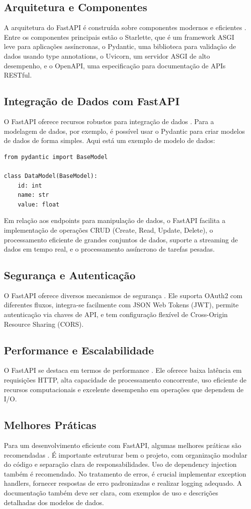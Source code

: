 \subsection{Arquitetura e Componentes}
A arquitetura do FastAPI é construída sobre componentes modernos e eficientes \cite{kumar2023modern}. Entre os componentes principais estão o Starlette, que é um framework ASGI leve para aplicações assíncronas, o Pydantic, uma biblioteca para validação de dados usando type annotations, o Uvicorn, um servidor ASGI de alto desempenho, e o OpenAPI, uma especificação para documentação de APIs RESTful.
\subsection{Integração de Dados com FastAPI}
O FastAPI oferece recursos robustos para integração de dados \cite{wilson2023data}. Para a modelagem de dados, por exemplo, é possível usar o Pydantic para criar modelos de dados de forma simples. Aqui está um exemplo de modelo de dados:
\begin{verbatim}
from pydantic import BaseModel

class DataModel(BaseModel):
    id: int
    name: str
    value: float
\end{verbatim}
Em relação aos endpoints para manipulação de dados, o FastAPI facilita a implementação de operações CRUD (Create, Read, Update, Delete), o processamento eficiente de grandes conjuntos de dados, suporte a streaming de dados em tempo real, e o processamento assíncrono de tarefas pesadas.
\subsection{Segurança e Autenticação}
O FastAPI oferece diversos mecanismos de segurança \cite{brown2023securing}. Ele suporta OAuth2 com diferentes fluxos, integra-se facilmente com JSON Web Tokens (JWT), permite autenticação via chaves de API, e tem configuração flexível de Cross-Origin Resource Sharing (CORS).
\subsection{Performance e Escalabilidade}
O FastAPI se destaca em termos de performance \cite{performance_metrics}. Ele oferece baixa latência em requisições HTTP, alta capacidade de processamento concorrente, uso eficiente de recursos computacionais e excelente desempenho em operações que dependem de I/O.
\subsection{Melhores Práticas}
Para um desenvolvimento eficiente com FastAPI, algumas melhores práticas são recomendadas \cite{martinez2023best}. É importante estruturar bem o projeto, com organização modular do código e separação clara de responsabilidades. Uso de dependency injection também é recomendado. No tratamento de erros, é crucial implementar exception handlers, fornecer respostas de erro padronizadas e realizar logging adequado. A documentação também deve ser clara, com exemplos de uso e descrições detalhadas dos modelos de dados.
